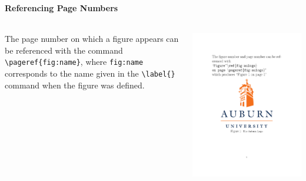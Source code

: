 \documentclass[article]{beamer}
\begin{document}
\begin{frame}
  \frametitle{\thesubsection}
  \framesubtitle{Referencing Page Numbers}
  \begin{columns}
    \begin{column}{0.5\textwidth}
      The page number on which a figure appears can be referenced with the
      command \texttt{\textbackslash pageref\{fig:name\}}, where \texttt{fig:name}
      corresponds to the name given in the \texttt{\textbackslash label\{\}}
      command when the figure was defined.
    \end{column}
    \begin{column}{0.5\textwidth}
      \colorbox{white}{\includegraphics[height=0.9\textheight]{figure_with_page_number_reference_example.pdf}}
    \end{column}
  \end{columns}
\end{frame}
\end{document}
